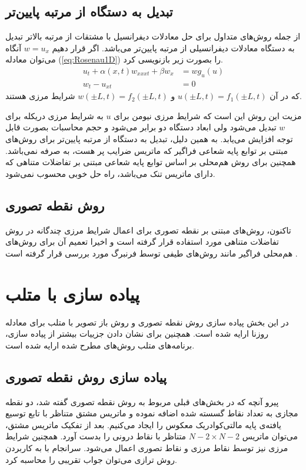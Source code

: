 \subsection{تبدیل به دستگاه از مرتبه پایین‌تر}

از جمله روش‌های متداول برای حل معادلات دیفرانسیل با مشتقات از مرتبه بالاتر تبدیل به دستگاه معادلات دیفرانسیلی از مرتبه پایین‌تر می‌باشد. اگر قرار دهیم
$w = u_x$
آنگاه می‌توان معادله
(\ref{eq:Rosenau1D}) 
را بصورت زیر بازنویسی کرد.
\begin{align}
u_t + \alpha(x,t)w_{xxxt}+\beta w_x &= wg_u(u)\\
w_t - u_{xt} &= 0
\end{align}
که در آن 
$u(\pm L,t)=f_1(\pm L,t)$ 
و
$w(\pm L,t)=f_2(\pm L,t)$
شرایط مرزی هستند. 


مزیت این روش این است که شرایط مرزی نیومن
برای $u$ به شرایط مرزی دریکله
 برای $w$ تبدیل می‌شود ولی ابعاد دستگاه دو برابر می‌شود و حجم محاسبات بصورت قابل توجه افزایش می‌یابد. به همین دلیل، تبدیل به دستگاه از مرتبه پایین‌تر برای روش‌های مبتنی بر توابع پایه شعاعی فراگیر که ماتریس ضرایب پر هست، به صرفه نمی‌باشد. همچنین برای روش ‌هم‌محلی بر اساس توابع پایه شعاعی مبتنی بر تفاضلات متناهی که دارای ماتریس تنک می‌باشد، راه حل خوبی محسوب نمی‌شود. 

\subsection{روش نقطه تصوری}

تاکنون، روش‌های مبتنی بر نقطه تصوری برای اعمال شرایط مرزی چندگانه در روش تفاضلات متناهی مورد استفاده قرار گرفته است و اخیرا تعمیم آن برای روش‌های هم‌محلی فراگیر مانند روش‌‌های طیفی توسط فرنبرگ
مورد بررسی قرار گرفته است
\citep{Fornberg}.

 
 
\section{
پیاده سازی با
\textsc{متلب}}

در این بخش پیاده سازی روش نقطه تصوری و روش باز تصویر با متلب برای معادله روزنا ارایه شده است. همچنین برای نشان دادن جزییات بیشتر از پیاده سازی، برنامه‌های متلب روش‌های مطرح شده ارایه شده است.

\subsection{ پیاده سازی روش نقطه تصوری}

پیرو آنچه که در بخش‌های قبلی مربوط به روش نقطه تصوری گفته شد، دو نقطه مجازی به تعداد نقاط  گسسته شده اضافه نموده و ماتریس مشتق متناظر با تابع توسیع یافته‌ی پایه‌ مالتی‌کوادریک معکوس را ایجاد می‌کنیم. بعد از تفکیک ماتریس مشتق، می‌توان ماتریس 
$N-2\times N-2$
متناظر با نقاط درونی را بدست آورد. همچنین شرایط مرزی نیز توسط نقاط مرزی و نقاط تصوری اعمال می‌شود. سرانجام با به کاربردن روش ترازی می‌توان جواب تقریبی را محاسبه کرد.

